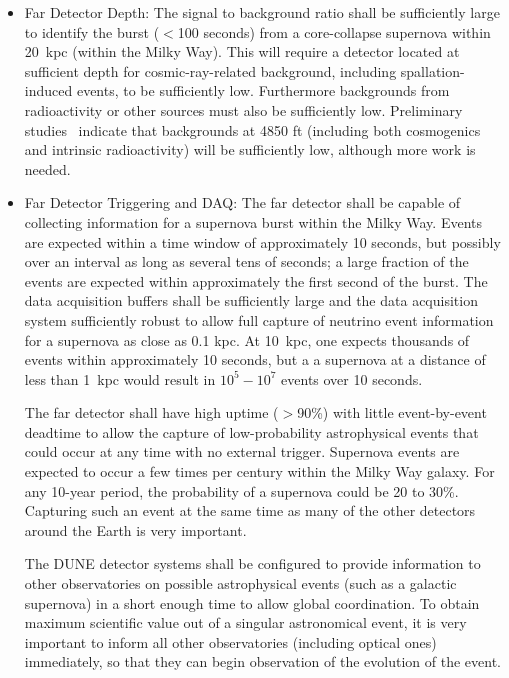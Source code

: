 \begin{itemize}

\item Far Detector Depth: The signal to background ratio shall be sufficiently large to identify the  burst ($<$100 seconds)  from a core-collapse supernova within 20~kpc (within the Milky Way). This will require a detector located at sufficient depth for cosmic-ray-related background, including spallation-induced events, to be sufficiently low.  Furthermore backgrounds from radioactivity or other sources must also be sufficiently low.  Preliminary studies~\cite{gehman} indicate that backgrounds at 4850 ft (including both cosmogenics and intrinsic radioactivity) will be sufficiently low, although more work is needed.

\item Far Detector Triggering and DAQ:  The far detector shall be capable of collecting information for a supernova burst within the Milky Way.  Events are expected within a time window of approximately 10 seconds, but possibly over an interval as long as several tens of seconds; a large fraction of the events are expected within approximately the first second of the burst.
The data acquisition buffers shall be sufficiently large and the data acquisition system sufficiently robust to allow full capture of neutrino event information for a supernova as close as 0.1 kpc.
At 10~kpc, one expects thousands of events within approximately 10 seconds, but a a supernova at a distance of less than 1~kpc would result in $10^5-10^7$  events over 10 seconds.    

The far detector shall have high uptime ($>$90\%) with little event-by-event deadtime to allow the capture of low-probability astrophysical events that could occur at any time with no external trigger. 
Supernova events are expected to occur a few times per century within the Milky Way galaxy. For any 10-year period, the probability of a supernova could be 20 to 30\%.  Capturing such an event at the same time as many of the other detectors around the Earth is very important.  

The DUNE detector systems shall be configured to provide  information to other observatories on possible astrophysical events (such as a galactic supernova) in a short enough time to allow global coordination.   
To obtain maximum scientific value out of a singular astronomical event, it is very important to inform all other observatories (including optical ones) immediately, so that they can begin observation of the evolution of the event. 


\end{itemize}
